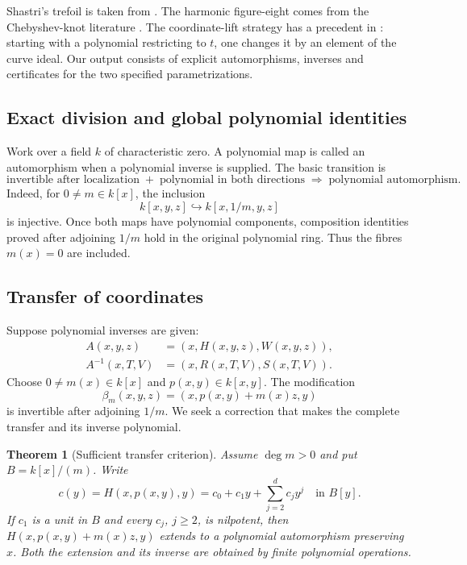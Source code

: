 \documentclass[11pt,a4paper]{article}
\newtheorem{theorem}{Theorem}[section]
\begin{document}
Shastri's trefoil is taken from \cite[\S3, Example~1]{Shastri}.
The harmonic figure-eight comes from the Chebyshev-knot literature
\cite[Introduction, Definition~1.2 and the following paragraph]{KP}.
The coordinate-lift strategy has a precedent in
\cite[Proposition~3, pp.~117--118]{Craighero}: starting with a polynomial
restricting to $t$, one changes it by an element of the curve ideal.
Our output consists of explicit automorphisms, inverses and certificates
for the two specified parametrizations.

\subsection{Exact division and global polynomial identities}

Work over a field $k$ of characteristic zero. A polynomial map is called an
automorphism when a polynomial inverse is supplied. The basic transition is
\[
\boxed{\text{invertible after localization}
\; +\; \text{polynomial in both directions}
\;\Longrightarrow\; \text{polynomial automorphism}.}
\]
Indeed, for $0\ne m\in k[x]$, the inclusion
\[
k[x,y,z]\hookrightarrow k[x,1/m,y,z]
\]
is injective. Once both maps have polynomial components, composition
identities proved after adjoining $1/m$ hold in the original polynomial
ring. Thus the fibres $m(x)=0$ are included.

\subsection{Transfer of coordinates}

Suppose polynomial inverses are given:
\begin{equation}\label{eq:given}
\begin{aligned}
A(x,y,z)&=(x,H(x,y,z),W(x,y,z)),\\
A^{-1}(x,T,V)&=(x,R(x,T,V),S(x,T,V)).
\end{aligned}
\end{equation}
Choose $0\ne m(x)\in k[x]$ and $p(x,y)\in k[x,y]$. The modification
\[
\beta_m(x,y,z)=(x,p(x,y)+m(x)z,y)
\]
is invertible after adjoining $1/m$. We seek a correction that makes the
complete transfer and its inverse polynomial.

\begin{theorem}[Sufficient transfer criterion]\label{thm:transfer}
Assume $\deg m>0$ and put $B=k[x]/(m)$. Write
\[
c(y)=H(x,p(x,y),y)=c_0+c_1y+\sum_{j=2}^{d}c_jy^j
\quad\text{in }B[y].
\]
If $c_1$ is a unit in $B$ and every $c_j$, $j\ge2$, is nilpotent, then
$H(x,p(x,y)+m(x)z,y)$ extends to a polynomial automorphism preserving $x$.
Both the extension and its inverse are obtained by finite polynomial
operations.
\end{theorem}
\end{document}
